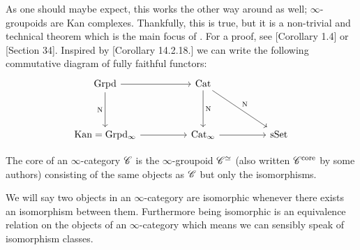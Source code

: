 \documentclass[../../thesis.tex]{subfiles}
\begin{document}
As one should maybe expect, this works the other way around as well; $\infty$-groupoids are Kan complexes.
Thankfully, this is true, but it is a non-trivial and technical theorem which is the main focus of \cite{Joyal}.
For a proof, see \cite{Joyal}[Corollary 1.4] or \cite{Rezk}[Section 34].
Inspired by \cite{Groth}[Corollary 14.2.18.] we can write the following commutative diagram of fully faithful functors:
\[\begin{tikzcd}
        {\mathrm{Grpd}} && {\mathrm{Cat}} \\
        \\
        {\mathrm{Kan}=\mathrm{Grpd_{\infty}}} && {\mathrm{Cat}_{\infty}} && \sset
        \arrow[from=1-1, to=1-3]
        \arrow["\Nerve"', from=1-1, to=3-1]
        \arrow[from=3-1, to=3-3]
        \arrow["\Nerve", from=1-3, to=3-3]
        \arrow[from=3-3, to=3-5]
        \arrow["\Nerve", from=1-3, to=3-5]
    \end{tikzcd}\]
\begin{definition}
    The core of an $\infty$-category $\mathscr{C}$ is the $\infty$-groupoid $\mathscr{C}^{\simeq}$ (also written $\mathscr{C}^{\text{core}}$ by some authors) consisting of the same objects as $\mathscr{C}$ but only the isomorphisms.
\end{definition}
We will say two objects in an $\infty$-category are isomorphic whenever there exists an isomorphism between them.
Furthermore being isomorphic is an equivalence relation on the objects of an $\infty$-category which means we can sensibly speak of isomorphism classes.
\end{document}
